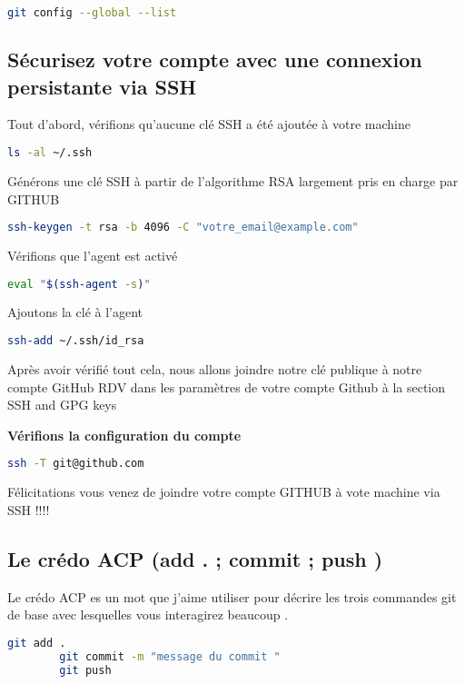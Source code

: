 \documentclass{article}
\begin{document}
	\begin{lstlisting}[language=bash]
	git config --global --list
	\end{lstlisting}
	
	\subsection{Sécurisez votre compte avec une connexion persistante via SSH}
	
	Tout d'abord, vérifions qu'aucune clé SSH a été ajoutée à votre machine
		\begin{lstlisting}[language=bash]
			ls -al ~/.ssh
 		\end{lstlisting}
 		
 	Générons une clé SSH à partir de l'algorithme RSA largement pris en charge par GITHUB
 	
 	\begin{lstlisting}[language=bash]
 		ssh-keygen -t rsa -b 4096 -C "votre_email@example.com"
 	\end{lstlisting}

 	Vérifions que l'agent est activé
 	 	\begin{lstlisting}[language=bash]
 			eval "$(ssh-agent -s)"
  		\end{lstlisting}
  		
  	Ajoutons la clé à l'agent 
  		\begin{lstlisting}[language=bash]
  			ssh-add ~/.ssh/id_rsa
  		\end{lstlisting}
  		
Après avoir vérifié tout cela, nous allons joindre notre clé publique à notre compte GitHub 
RDV dans les paramètres de votre compte Github à la section SSH and GPG keys 
  		
      \textbf{Vérifions la configuration du compte} 
  		\begin{lstlisting}[language=bash]
  			ssh -T git@github.com
  		\end{lstlisting}
  		
  		Félicitations vous venez de joindre votre compte GITHUB à vote machine via SSH !!!!
  	
 \subsection{Le crédo ACP (add . ; commit ; push )}
	
 Le crédo ACP es un mot que j'aime utiliser pour décrire les trois commandes git de base avec lesquelles vous interagirez beaucoup . 
	\begin{lstlisting}[language=bash]
		git add . 
		git commit -m "message du commit "
		git push 
	\end{lstlisting}
	
\end{document}

